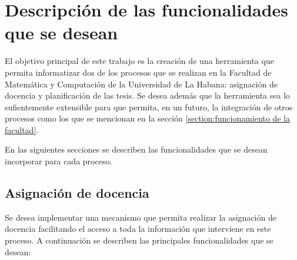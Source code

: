 \chapter{Descripción de las funcionalidades que se desean}\label{chapter:features}
El objetivo principal de este trabajo es la creación de una herramienta
que permita informatizar dos de los procesos que se realizan en la Facultad de Matemática y
Computación de la Universidad de La Habana: asignación de docencia y planificación de las tesis. 
Se desea además que la herramienta sea lo sufientemente 
extensible para que permita, en un futuro, la integración de otros procesos como los que se mencionan en la 
sección \ref{section:funcionamiento de la facultad}.



En las siguientes secciones se describen las funcionalidades
que se desean incorporar para cada proceso.















\section{Asignación de docencia}
Se desea implementar una mecanismo que permita realizar la asignación de docencia 
facilitando el acceso a toda la información que interviene en este proceso. A continuación 
se describen las principales funcionalidades que se desean:


